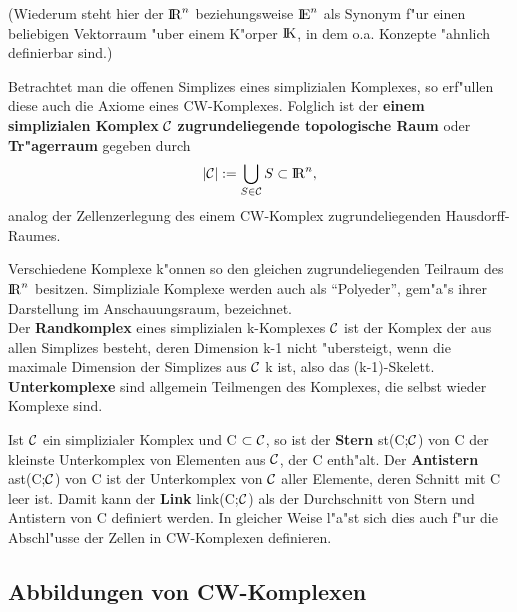 (Wiederum steht hier der $\mbox{$\rm I\!R$}^n$ beziehungsweise $\mbox{$\rm I\!E$}^n$ als Synonym f"ur einen
beliebigen Vektorraum "uber einem K"orper $\mbox{$\rm I\!K$}$, in dem o.a. Konzepte "ahnlich
definierbar sind.)

Betrachtet man die offenen Simplizes eines simplizialen Komplexes, so
erf"ullen diese auch die Axiome eines CW-Komplexes. Folglich ist der {\bf einem
simplizialen Komplex} $\cal C$ {\bf zugrundeliegende topologische Raum}
 oder {\bf Tr"agerraum}
 gegeben durch
$$|{\cal C}| := \bigcup\limits_{S\in{\cal C}} S \subset \mbox{$\rm I\!R$}^n,$$
analog der Zellenzerlegung des einem CW-Komplex zugrundeliegenden
Hausdorff-Raumes.

Verschiedene Komplexe k"onnen so den gleichen zugrundeliegenden Teilraum des
$\mbox{$\rm I\!R$}^n$ besitzen. Simpliziale Komplexe werden auch als "`Polyeder"', gem"a"s
ihrer Darstellung im Anschauungsraum, bezeichnet.\\
Der {\bf Randkomplex} eines simplizialen k-Komplexes $\cal C$ ist der Komplex
der aus allen Simplizes besteht, deren Dimension k-1 nicht "ubersteigt, wenn
die maximale Dimension der Simplizes aus $\cal C$ k ist, also das
(k-1)-Skelett.\\
{\bf Unterkomplexe} sind allgemein Teilmengen des Komplexes, die
selbst wieder Komplexe sind.

Ist $\cal C$ ein simplizialer Komplex und C $\subset\cal C$, so ist der
{\bf Stern} st(C;$\cal C$) von C der kleinste
Unterkomplex von Elementen aus $\cal C$, der C enth"alt. Der {\bf Antistern}
 ast(C;$\cal C$) von C ist der
Unterkomplex von $\cal C$ aller Elemente, deren Schnitt mit C leer ist. Damit
kann der {\bf Link}
link(C;$\cal C$) als der Durchschnitt von Stern und Antistern von C definiert
werden. In gleicher Weise l"a"st sich dies auch f"ur die Abschl"usse der Zellen
in CW-Komplexen definieren.

\subsection{Abbildungen von CW-Komplexen}

